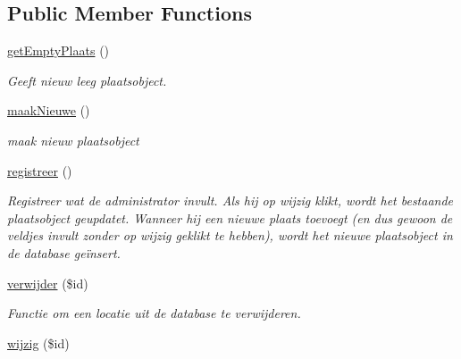 \subsection*{Public Member Functions}
\begin{DoxyCompactItemize}
\item 
\mbox{\label{class_plaats_a4edb281c57e2c512a3de32eb47242513}} 
\mbox{\hyperlink{class_plaats_a4edb281c57e2c512a3de32eb47242513}{get\+Empty\+Plaats}} ()
\begin{DoxyCompactList}\small\item\em Geeft nieuw leeg plaatsobject. \end{DoxyCompactList}\item 
\mbox{\label{class_plaats_a3e3826f42bcaf4f6c70da8f9acdcca4a}} 
\mbox{\hyperlink{class_plaats_a3e3826f42bcaf4f6c70da8f9acdcca4a}{maak\+Nieuwe}} ()
\begin{DoxyCompactList}\small\item\em maak nieuw plaatsobject \end{DoxyCompactList}\item 
\mbox{\label{class_plaats_a80dd308fc0b6be4fcb7853ee9a3556ad}} 
\mbox{\hyperlink{class_plaats_a80dd308fc0b6be4fcb7853ee9a3556ad}{registreer}} ()
\begin{DoxyCompactList}\small\item\em Registreer wat de administrator invult. Als hij op wijzig klikt, wordt het bestaande plaatsobject geupdatet. Wanneer hij een nieuwe plaats toevoegt (en dus gewoon de veldjes invult zonder op wijzig geklikt te hebben), wordt het nieuwe plaatsobject in de database geïnsert. \end{DoxyCompactList}\item 
\mbox{\label{class_plaats_a7e448db214202eec8608da6984fd1cd8}} 
\mbox{\hyperlink{class_plaats_a7e448db214202eec8608da6984fd1cd8}{verwijder}} (\$id)
\begin{DoxyCompactList}\small\item\em Functie om een locatie uit de database te verwijderen. \end{DoxyCompactList}\item 
\mbox{\label{class_plaats_a14e607ff92a5fd06cf984c5970ad4c1a}} 
\mbox{\hyperlink{class_plaats_a14e607ff92a5fd06cf984c5970ad4c1a}{wijzig}} (\$id)

\end{DoxyCompactItemize}
